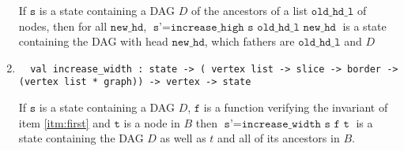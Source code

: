 \begin{enumerate}
 If $\texttt{s}$ is a state containing a DAG $D$ of the ancestors of a list $\texttt{old\_hd\_l}$ of nodes, then for all $\texttt{new\_hd}$, $\texttt{s'} = \texttt{increase\_high s old\_hd\_l new\_hd}$ is a state containing the DAG with head $\texttt{new\_hd}$, which fathers are $\texttt{old\_hd\_l}$ and $D$
 \item 
 \begin{lstlisting}
  val increase_width : state -> ( vertex list -> slice -> border -> (vertex list * graph)) -> vertex -> state
 \end{lstlisting}

 If $\texttt{s}$ is a state containing a DAG $D$, $\texttt{f}$ is a function verifying the invariant of item \ref{itm:first} and $\texttt{t}$ is a node in $B$ then $\texttt{s'} = \texttt{increase\_width s f t}$ is a state containing the DAG $D$ as well as $t$ and all of its ancestors in $B$.
\end{enumerate}
